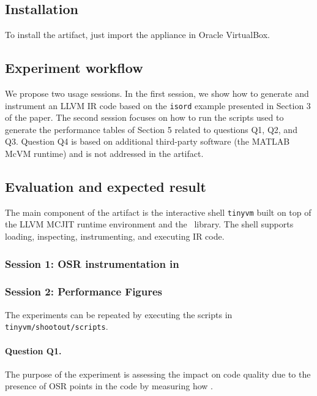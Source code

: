 \subsection{Installation}

To install the artifact, just import the appliance in Oracle VirtualBox.

\subsection{Experiment workflow}

We propose two usage sessions. In the first session, we show how to generate and instrument an LLVM IR code based on the \texttt{isord} example presented in Section 3 of the paper. The second session focuses on how to run the scripts used to generate the performance tables of Section 5 related to questions Q1, Q2, and Q3. Question Q4 is based on additional third-party software (the MATLAB McVM runtime) and is not addressed in the artifact.

\subsection{Evaluation and expected result}

The main component of the artifact is the interactive shell {\tt tinyvm} built on top of the LLVM MCJIT runtime environment and the \osrkit\ library. The shell supports loading, inspecting, instrumenting, and executing IR code.

\subsubsection{Session 1: OSR instrumentation in \osrkit}

\subsubsection{Session 2: Performance Figures}

The experiments can be repeated by executing the scripts in {\tt tinyvm/shootout/scripts}.

\paragraph{Question Q1.} The purpose of the experiment is assessing the impact on code quality due to the presence of OSR points in the code by measuring how .

